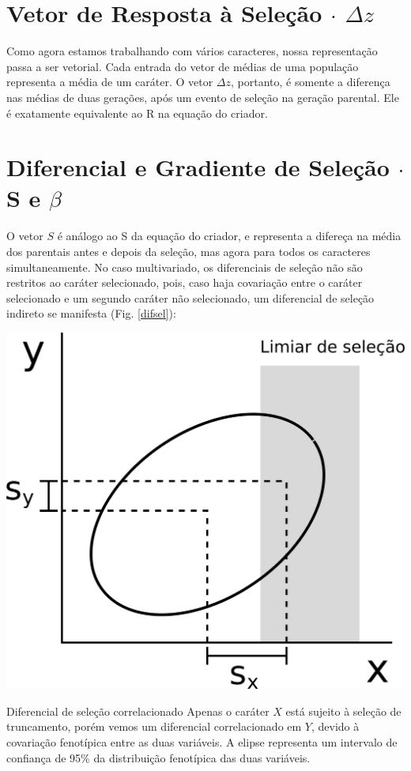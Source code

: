 \documentclass[portuges,]{tufte-handout}
\begin{document}
\section{Vetor de Resposta à Seleção $\cdot$
$\Delta z$}\label{vetor-de-resposta-uxe0-seleuxe7uxe3o-cdot-delta-z}

Como agora estamos trabalhando com vários caracteres, nossa
representação passa a ser vetorial. Cada entrada do vetor de médias de
uma população representa a média de um caráter. O vetor $\Delta z$,
portanto, é somente a diferença nas médias de duas gerações, após um
evento de seleção na geração parental. Ele é exatamente equivalente ao R
na equação do criador.

\section{Diferencial e Gradiente de Seleção $\cdot$ S e
$\beta$}\label{diferencial-e-gradiente-de-seleuxe7uxe3o-cdot-s-e-beta}

O vetor $S$ é análogo ao S da equação do criador, e representa a
difereça na média dos parentais antes e depois da seleção, mas agora
para todos os caracteres simultaneamente. No caso multivariado, os
diferenciais de seleção não são restritos ao caráter selecionado, pois,
caso haja covariação entre o caráter selecionado e um segundo caráter
não selecionado, um diferencial de seleção indireto se manifesta (Fig.
\ref{difsel}):

\begin{marginfigure}
\includegraphics{./figuras/diferencialdeselecao.png}
\caption{Diferencial de seleção correlacionado Apenas o caráter
\(X\) está sujeito à seleção de truncamento, porém vemos um diferencial
correlacionado em \(Y\), devido à covariação fenotípica entre as duas
variáveis. A elipse representa um intervalo de confiança de 95\% da
distribuição fenotípica das duas variáveis.}
\label{difsel}
\end{marginfigure}
\end{document}
